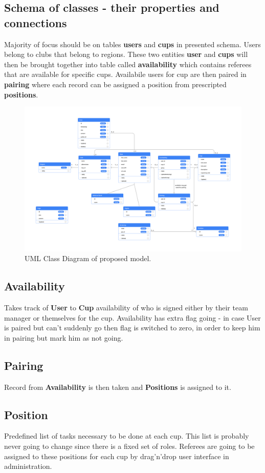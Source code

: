 \subsection*{Schema of classes - their properties and connections}
Majority of focus should be on tables \textbf{users} and \textbf{cups} in presented schema. Users belong to clubs that belong to regions. These two entities \textbf{user} and \textbf{cups} will then be brought together into table called \textbf{availability} which contains referees that are available for specific cups. Availabile users for cup are then paired in \textbf{pairing} where each record can be assigned a position from prescripted \textbf{positions}.
\newline
\begin{figure}[h]
\includegraphics[scale=0.160]{img/swimmpair_uml.png}
  \caption{UML Class Diagram of proposed model.}
  \label{fig1.2:uml}
\end{figure}
\subsection*{Availability}
Takes track of \textbf{User} to \textbf{Cup} availability of who is signed either by their team manager or themselves for the cup. Availability has extra flag going - in case User is paired but can't suddenly go then flag is switched to zero, in order to keep him in pairing but mark him as not going.
\subsection*{Pairing}
Record from \textbf{Availability} is then taken and \textbf{Positions} is assigned to it. 
\subsection*{Position}
Predefined list of tasks necessary to be done at each cup. This list is probably never going to change since there is a fixed set of roles. Referees are going to be assigned to these positions for each cup by drag'n'drop user interface in administration.
\newpage
